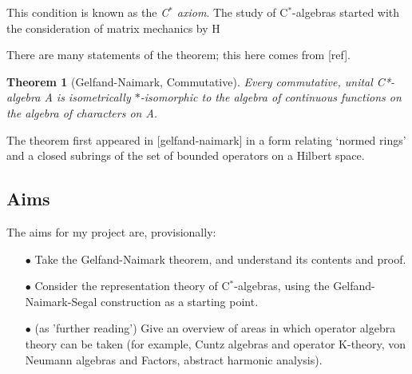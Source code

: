 \documentclass[12pt,a4paper]{amsart}
\theoremstyle{plain}
\newtheorem*{thm*}{Theorem}
\theoremstyle{defn}
\begin{document}
This condition is known as the \emph{C$^\ast$ axiom}. The study of C$^\ast$-algebras started with the consideration of matrix mechanics by H

There are many statements of the theorem; this here comes from [ref].
\begin{thm*}[Gelfand-Naimark, Commutative]
	Every commutative, unital C*-algebra A is isometrically $\ast$-isomorphic to the algebra of continuous functions on the algebra of characters on A.

\end{thm*}
The theorem first appeared in [gelfand-naimark] in a form relating `normed rings' and a closed subrings of the set of bounded operators on a Hilbert space.


\subsection{Aims}
The aims for my project are, provisionally:
\begin{enumerate}

	\item[$\bullet$] Take the Gelfand-Naimark theorem, and understand its contents and proof.
	\item[$\bullet$] Consider the representation theory of C$^\ast$-algebras, using the Gelfand-Naimark-Segal construction as a starting point.
	\item[$\bullet$] (as 'further reading') Give an overview of areas in which operator algebra theory can be taken (for example, Cuntz algebras and operator K-theory, von Neumann algebras and Factors, abstract harmonic analysis).
\end{enumerate}

\begin{thebibliography}{00}
	
	
	
\end{thebibliography}
\end{document}
